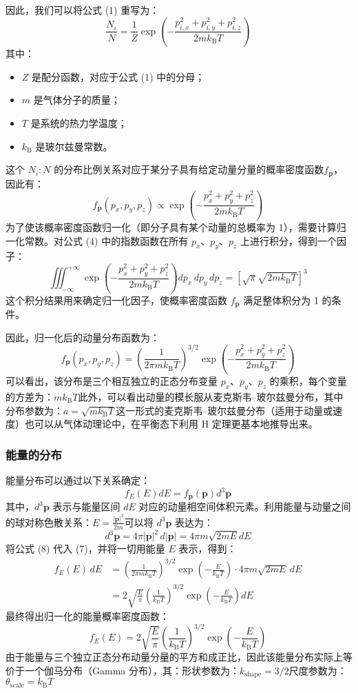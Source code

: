 因此，我们可以将公式 (1) 重写为：
$$
\frac{N_i}{N} = \frac{1}{Z} \exp\left( -\frac{p_{i,x}^2 + p_{i,y}^2 + p_{i,z}^2}{2m k_{\text{B}} T} \right) \tag{3}~
$$
其中：
\begin{itemize}
\item $Z$ 是配分函数，对应于公式 (1) 中的分母；
\item $m$ 是气体分子的质量；
\item $T$ 是系统的热力学温度；
\item $k_{\text{B}}$ 是玻尔兹曼常数。
\end{itemize}
这个 $N_i : N$ 的分布比例关系对应于某分子具有给定动量分量的概率密度函数$f_{\mathbf{p}}$，因此有：
$$
f_{\mathbf{p}}(p_x, p_y, p_z) \propto \exp\left( -\frac{p_x^2 + p_y^2 + p_z^2}{2m k_{\text{B}} T} \right) \tag{4}~
$$
为了使该概率密度函数归一化（即分子具有某个动量的总概率为 1），需要计算归一化常数。对公式 (4) 中的指数函数在所有 $p_x$、$p_y$、$p_z$ 上进行积分，得到一个因子：
$$
\iiint_{-\infty}^{+\infty} \exp\left( -\frac{p_x^2 + p_y^2 + p_z^2}{2m k_{\text{B}} T} \right) dp_x\, dp_y\, dp_z = \left[ \sqrt{\pi} \sqrt{2m k_{\text{B}} T} \right]^3~
$$
这个积分结果用来确定归一化因子，使概率密度函数 $f_{\mathbf{p}}$ 满足整体积分为 1 的条件。

因此，归一化后的动量分布函数为：
$$
f_{\mathbf{p}}(p_x, p_y, p_z) = \left( \frac{1}{2\pi m k_{\text{B}} T} \right)^{3/2} \exp\left( -\frac{p_x^2 + p_y^2 + p_z^2}{2m k_{\text{B}} T} \right) \tag{6}~
$$
可以看出，该分布是三个相互独立的正态分布变量 $p_x$、$p_y$、$p_z$ 的乘积，每个变量的方差为：$m k_{\text{B}} T$此外，可以看出动量的模长服从麦克斯韦–玻尔兹曼分布，其中分布参数为：$a = \sqrt{m k_{\text{B}} T}$这一形式的麦克斯韦–玻尔兹曼分布（适用于动量或速度）也可以从气体动理论中，在平衡态下利用 H 定理更基本地推导出来。
\subsubsection{能量的分布}
能量分布可以通过以下关系确定：
$$
f_E(E)dE = f_{\mathbf{p}}(\mathbf{p})d^3\mathbf{p} \tag{7}~
$$
其中，$d^3\mathbf{p}$ 表示与能量区间 $dE$ 对应的动量相空间体积元素。利用能量与动量之间的球对称色散关系：$E = \frac{|\mathbf{p}|^2}{2m}$可以将 $d^3\mathbf{p}$ 表达为：
$$
d^3\mathbf{p} = 4\pi |\mathbf{p}|^2\, d|\mathbf{p}| = 4\pi m \sqrt{2mE} dE \tag{8}~
$$
将公式 (8) 代入 (7)，并将一切用能量 $E$ 表示，得到：
$$
\begin{aligned}
f_E(E)\,dE &= \left( \frac{1}{2\pi m k_{\text{B}} T} \right)^{3/2} \exp\left( -\frac{E}{k_{\text{B}} T} \right) \cdot 4\pi m \sqrt{2mE}\, dE \\
&= 2 \sqrt{ \frac{E}{\pi} } \left( \frac{1}{k_{\text{B}} T} \right)^{3/2} \exp\left( -\frac{E}{k_{\text{B}} T} \right) dE
\end{aligned}~
$$
最终得出归一化的能量概率密度函数：
$$
f_E(E) = 2 \sqrt{ \frac{E}{\pi} } \left( \frac{1}{k_{\text{B}} T} \right)^{3/2} \exp\left( -\frac{E}{k_{\text{B}} T} \right) \tag{9}~
$$
由于能量与三个独立正态分布动量分量的平方和成正比，因此该能量分布实际上等价于一个伽马分布（Gamma 分布），其：形状参数为：$k_{\text{shape}} = 3/2$尺度参数为：$\theta_{\text{scale}} = k_{\text{B}} T$

